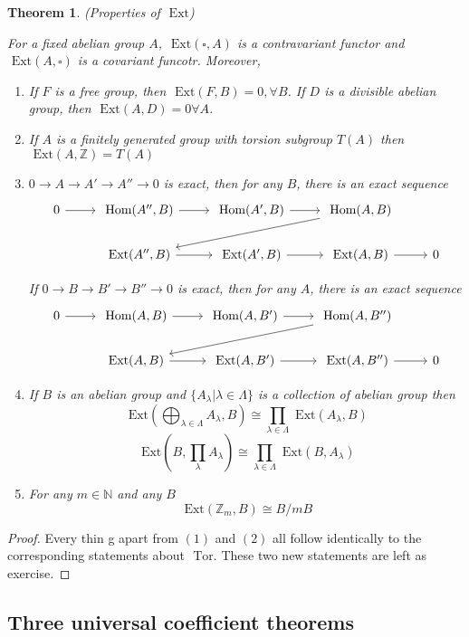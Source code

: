 \documentclass[11pt]{article}
\newtheorem{thm}{Theorem}[section]
\renewcommand{\hom}{\text{ Hom}}
\newcommand{\tor}{\text{ Tor}}
\newcommand{\ext}{\text{ Ext}}
\newcommand{\intg}{\mathbb Z}
\newcommand{\lrta}{\longrightarrow}
\begin{document}
\begin{thm}
(Properties of $\ext$)

For a fixed abelian group $A$, $\ext(\square, A)$ is a contravariant functor and $\ext(A,\square)$ is a covariant funcotr. Moreover,
\begin{enumerate}[label=(\arabic*)]
\item If $F$ is a free group, then $\ext (F,B)=0,\forall B$. If $D$ is a divisible abelian group, then $\ext (A,D)=0\forall A$.
\item If  $A$ is a finitely generated group with torsion subgroup $T(A)$ then $\ext(A,\intg)=T(A)$
\item $0\lrta A\lrta A'\lrta A''\lrta 0$ is exact, then for any $B$, there is an exact sequence
$$
\begin{tikzcd}
0 \arrow[r] & \hom(A'',B) \arrow[r] & \hom(A',B) \arrow[r] & \hom(A,B) \arrow[lld] &  \\
 & \ext(A'',B) \arrow[r] & \ext(A',B) \arrow[r] & \ext(A,B) \arrow[r] & 0
\end{tikzcd}
$$


If $0\lrta B\lrta B'\lrta B''\lrta 0$ is exact, then for any $A$, there is an exact sequence
$$
\begin{tikzcd}
0 \arrow[r] & \hom(A,B) \arrow[r] & \hom(A,B') \arrow[r] & \hom(A,B'') \arrow[lld] &  \\
 & \ext(A,B) \arrow[r] & \ext(A,B') \arrow[r] & \ext(A,B'') \arrow[r] & 0
\end{tikzcd}
$$
\item If $B$ is an abelian group and $\{A_\lambda|\lambda\in \Lambda\}$ is a collection of abelian group then 
$$
\ext\left(\bigoplus_{\lambda\in\Lambda} A_\lambda,B\right)\cong \prod_{\lambda\in \Lambda} \ext(A_\lambda, B)
$$
$$
\ext\left(B, \prod_\lambda A_\lambda\right)\cong \prod_{\lambda\in \Lambda} \ext(B,A_\lambda)
$$
\item For any $m\in \mathbb{N}$ and any $B$
$$
\ext(\intg_m, B)\cong B/mB
$$
\end{enumerate}
\end{thm}
\begin{proof}
Every thin g apart from $(1)$ and $(2)$ all follow identically to the corresponding statements about $\tor$. These two new statements are left as exercise. 
\end{proof}

\subsection*{Three universal coefficient theorems}
\end{document}
